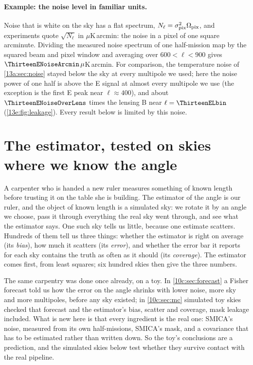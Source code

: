 \paragraph{Example: the noise level in familiar units.} Noise that is white on the sky has a flat spectrum,
$N_\ell=\sigma_{\rm pix}^2\Omega_{\rm pix}$, and experiments quote $\sqrt{N_\ell}$ in $\mu$K\,arcmin: the
noise in a pixel of one square arcminute. Dividing the measured noise spectrum of one half-mission map by the
squared beam and pixel window and averaging over $600<\ell<900$ gives $\ThirteenENoiseArcmin\,\mu$K\,arcmin.
For comparison, the temperature noise of \cref{13a:sec:noise} stayed below the sky at every multipole we used;
here the noise power of one half is above the E signal at almost every multipole we use (the exception is
the first E peak near $\ell\approx400$), and about $\ThirteenENoiseOverLens$ times the lensing B near $\ell=\ThirteenELbin$
(\cref{13e:fig:leakage}). Every result below is limited by this noise.
\section{The estimator, tested on skies where we know the angle}
\label{13e:sec:estimator}

A carpenter who is handed a new ruler measures something of known length before trusting it on the table
she is building. The estimator of the angle is our ruler, and the object of known length is a simulated
sky: we rotate it by an angle we choose, pass it through everything the real sky went through, and see what
the estimator says. One such sky tells us little, because one estimate scatters. Hundreds of them tell us
three things: whether the estimator is right on average (its \emph{bias}), how much it scatters (its
\emph{error}), and whether the error bar it reports for each sky contains the truth as often as it should
(its \emph{coverage}). The estimator comes first, from least squares; six hundred skies then give the
three numbers.

The same carpentry was done once already, on a toy. In \cref{10c:sec:forecast} a Fisher forecast told us
how the error on the angle shrinks with lower noise, more sky and more multipoles, before any sky existed;
in \cref{10c:sec:mc} simulated toy skies checked that forecast and the estimator's bias, scatter and
coverage, mask leakage included. What is new here is that every ingredient is the real one: SMICA's noise,
measured from its own half-missions, SMICA's mask, and a covariance that has to be estimated rather than
written down. So the toy's conclusions are a prediction, and the simulated skies below test whether they
survive contact with the real pipeline.

